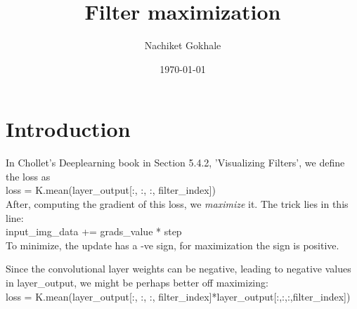 \documentclass{article}
\begin{document}
\title{Filter maximization}
\author{Nachiket Gokhale}
\date{\today}
\maketitle
\section{Introduction}
In Chollet's Deeplearning book in Section 5.4.2, 'Visualizing Filters', we define the loss as \\

loss = K.mean(layer\_output[:, :, :, filter\_index]) \\


After, computing the gradient of this loss, we \textit{maximize} it. The trick lies in this line:\\

input\_img\_data += grads\_value * step\\

To minimize, the update has a -ve sign, for maximization the sign is positive.

Since the convolutional layer weights can be negative, leading to negative values in layer\_output, we might be perhaps better off maximizing:\\

loss = K.mean(layer\_output[:, :, :, filter\_index]*layer\_output[:,:,:,filter\_index]) \\
\end{document}

